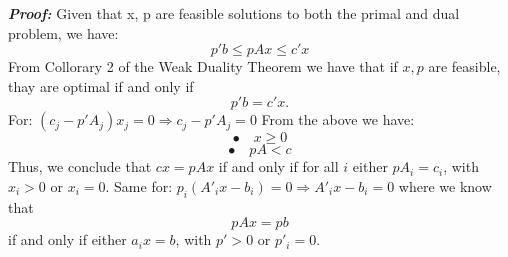 \documentclass[12pt]{article}
\begin{document}
\textbf{\textit{Proof:}}\newline
Given that x, p are feasible solutions to both the primal and dual problem, we have:
$$p'b \leq pAx \leq c'x$$
From Collorary 2 of the Weak Duality Theorem we have that if $x, p$ are feasible, thay are optimal if and only if $$p'b = c'x.$$
For: $(c_j - p'A_j)x_j = 0 \Longrightarrow c_j - p'A_j = 0$\newline
From the above we have: $$\bullet \quad x \geq 0$$ $$\bullet \quad pA < c$$
Thus, we conclude that $cx = pAx$ if and only if for all $i$ either $pA_i = c_i$, with $x_i > 0$ or $x_i = 0$.\newline
Same for: $p_i(A'_ix - b_i) = 0 \Longrightarrow A'_ix - b_i = 0$\newline
where we know that $$pAx = pb$$ if and only if either $a_ix = b$, with $p' >0$ or $p'_i = 0$.
  	
\end{document}
